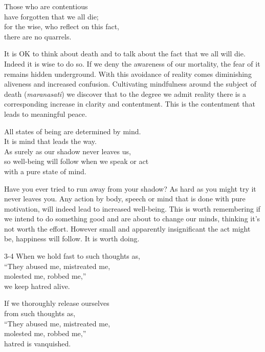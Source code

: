 
\begin{dhpVerse}{6}
\label{dhp-6}
Those who are contentious\\
have forgotten that we all die;\\
for the wise, who reflect on this fact,\\
there are no quarrels.
\end{dhpVerse}

\begin{dhpRefl}

It is OK to think about death and to talk about the fact that we all
will die. Indeed it is wise to do so. If we deny the awareness of our
mortality, the fear of it remains hidden underground. With this
avoidance of reality comes diminishing aliveness and increased
confusion. Cultivating mindfulness around the subject of death
(\emph{maranasati}) we discover that to the degree we admit reality there is
a corresponding increase in clarity and contentment. This is the
contentment that leads to meaningful peace.

\end{dhpRefl}


\begin{dhpVerse}{2}
\label{dhp-2}
All states of being are determined by mind.\\
It is mind that leads the way.\\
As surely as our shadow never leaves us,\\
so well-being will follow when we speak or act\\
with a pure state of mind.
\end{dhpVerse}

\begin{dhpRefl}

Have you ever tried to run away from your shadow? As hard as you
might try it never leaves you. Any action by body, speech or mind
that is done with pure motivation, will indeed lead to increased
well-being. This is worth remembering if we intend to do something
good and are about to change our minds, thinking it's not worth the
effort. However small and apparently insignificant the act might be,
happiness will follow. It is worth doing.

\end{dhpRefl}


\begin{dhpVerse}{3-4}
\label{dhp-3}\label{dhp-4}
When we hold fast to such thoughts as,\\
``They abused me, mistreated me,\\
molested me, robbed me,''\\
we keep hatred alive.

If we thoroughly release ourselves\\
from such thoughts as,\\
``They abused me, mistreated me,\\
molested me, robbed me,''\\
hatred is vanquished.
\end{dhpVerse}

